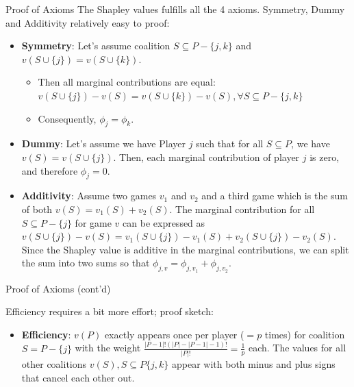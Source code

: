 \documentclass[aspectratio=169]{../latex_main/tntbeamer}  %
\begin{document}
\begin{frame}{Proof of Axioms}
  The Shapley values fulfills all the 4 axioms.
  Symmetry, Dummy and Additivity relatively easy to proof:
\begin{itemize}
  \item \textbf{Symmetry}: Let's assume coalition $S \subseteq P - \{j,k\}$ and $v(S \cup \{j\}) = v(S \cup \{k\})$. 
    \begin{itemize}
        \item Then all marginal contributions are equal: $v(S \cup \{j\}) -  v(S) = v(S \cup \{k\}) -  v(S), \forall S \subseteq P - \{j,k\}$
        \item Consequently, $\phi_j = \phi_k$.
    \end{itemize}
  \pause
  \item \textbf{Dummy}: Let's assume we have Player $j$ such that for all $S \subseteq P$, we have $v(S) = v(S \cup \{j\})$. Then, each marginal contribution of player $j$ is zero, and therefore $\phi_j = 0$.
  \pause
  \item \textbf{Additivity}:  Assume two games $v_1$ and $v_2$ and a third game which is the sum of both $v(S) = v_1(S) + v_2(S)$. The marginal contribution for all $S \subseteq P - \{j\}$ for game $v$ can be expressed as $v(S \cup \{j\}) - v(S) = v_1(S \cup \{j\}) - v_1(S) + v_2(S \cup \{j\}) - v_2(S)$. Since the Shapley value is additive in the marginal contributions, we can split the sum into two sums so that $\phi_{j,v} = \phi_{j, v_1} + \phi_{j,v_2}$.
\end{itemize}
\end{frame}

\begin{frame}{Proof of Axioms (cont'd)}
    
Efficiency requires a bit more effort; proof sketch:
  \begin{itemize}
  \item \textbf{Efficiency}: $v(P)$ exactly appears once per player ($=p$ times) for coalition $S = P - \{j\}$ with the weight $\frac{|P - 1|!(|P| - |P - 1| - 1)!}{|P|!} = \frac{1}{p}$ each. The values for all other coalitions $v(S), S \subseteq P \{j,k\}$ appear with both minus and plus signs that cancel each other out.
\end{itemize}
\end{frame}
\end{document}
